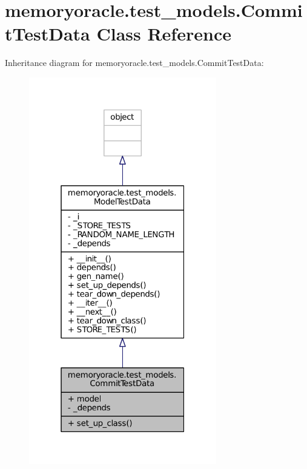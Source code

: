\hypertarget{classmemoryoracle_1_1test__models_1_1CommitTestData}{}\section{memoryoracle.\+test\+\_\+models.\+Commit\+Test\+Data Class Reference}
\label{classmemoryoracle_1_1test__models_1_1CommitTestData}


Inheritance diagram for memoryoracle.\+test\+\_\+models.\+Commit\+Test\+Data\+:\nopagebreak
\begin{figure}[H]
\begin{center}
\leavevmode
\includegraphics[width=232pt]{classmemoryoracle_1_1test__models_1_1CommitTestData__inherit__graph}
\end{center}
\end{figure}


